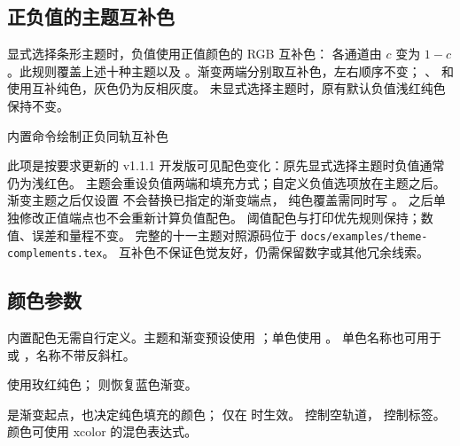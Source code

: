 \subsection{正负值的主题互补色}
显式选择条形主题时，负值使用正值颜色的 RGB 互补色：
各通道由 $c$ 变为 $1-c$。此规则覆盖上述十种主题以及
。渐变两端分别取互补色，左右顺序不变；
、 和  使用互补纯色，灰色仍为反相灰度。
未显式选择主题时，原有默认负值浅红纯色保持不变。
\begin{example}{内置命令绘制正负同轨互补色}



\end{example}
此项是按要求更新的 v1.1.1 开发版可见配色变化：原先显式选择主题时负值通常仍为浅红色。
主题会重设负值两端和填充方式；自定义负值选项放在主题之后。
渐变主题之后仅设置  不会替换已指定的渐变端点，
纯色覆盖需同时写 。
之后单独修改正值端点也不会重新计算负值配色。
阈值配色与打印优先规则保持；数值、误差和量程不变。
完整的十一主题对照源码位于 \texttt{docs/examples/theme-complements.tex}。
互补色不保证色觉友好，仍需保留数字或其他冗余线索。

\subsection{颜色参数}
内置配色无需自行定义。主题和渐变预设使用 ；单色使用 。
单色名称也可用于  或 ，名称不带反斜杠。

 使用玫红纯色；
 则恢复蓝色渐变。

 是渐变起点，也决定纯色填充的颜色；
 仅在  时生效。
 控制空轨道， 控制标签。
颜色可使用 xcolor 的混色表达式。


